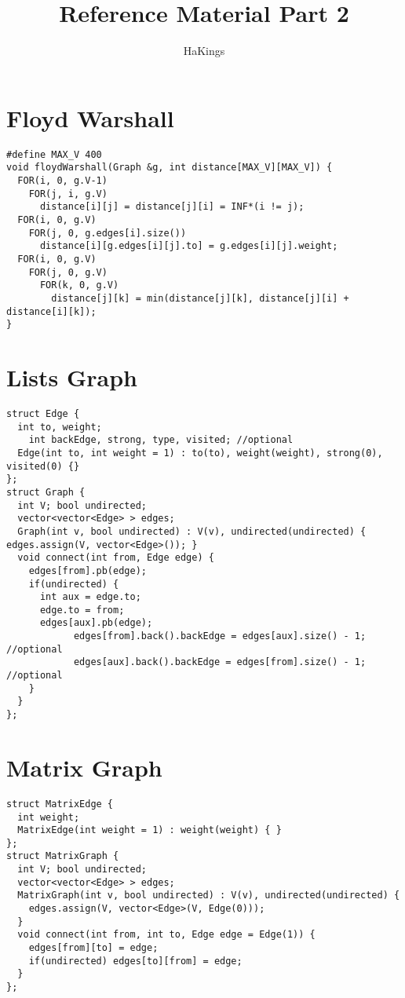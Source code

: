 \documentclass[11pt, oneside]{article}
\title{Reference Material Part 2}
\author{HaKings}
\date{}
\begin{document}
\maketitle
\newpage
\tableofcontents
\newpage

\section{Floyd Warshall}
\begin{lstlisting}
#define MAX_V 400
void floydWarshall(Graph &g, int distance[MAX_V][MAX_V]) {
  FOR(i, 0, g.V-1)
    FOR(j, i, g.V)
      distance[i][j] = distance[j][i] = INF*(i != j);
  FOR(i, 0, g.V)
    FOR(j, 0, g.edges[i].size())
      distance[i][g.edges[i][j].to] = g.edges[i][j].weight;
  FOR(i, 0, g.V)
    FOR(j, 0, g.V)
      FOR(k, 0, g.V)
        distance[j][k] = min(distance[j][k], distance[j][i] + distance[i][k]);
}
\end{lstlisting}
\section{Lists Graph}
\begin{lstlisting}
struct Edge {
  int to, weight;
    int backEdge, strong, type, visited; //optional
  Edge(int to, int weight = 1) : to(to), weight(weight), strong(0), visited(0) {}
};
struct Graph {
  int V; bool undirected;
  vector<vector<Edge> > edges;
  Graph(int v, bool undirected) : V(v), undirected(undirected) { edges.assign(V, vector<Edge>()); }
  void connect(int from, Edge edge) {
    edges[from].pb(edge);
    if(undirected) {
      int aux = edge.to;
      edge.to = from;
      edges[aux].pb(edge);
            edges[from].back().backEdge = edges[aux].size() - 1; //optional
            edges[aux].back().backEdge = edges[from].size() - 1; //optional
    }
  }
};

\end{lstlisting}
\section{Matrix Graph}
\begin{lstlisting}
struct MatrixEdge {
  int weight;
  MatrixEdge(int weight = 1) : weight(weight) { }
};
struct MatrixGraph {
  int V; bool undirected;
  vector<vector<Edge> > edges;
  MatrixGraph(int v, bool undirected) : V(v), undirected(undirected) {
    edges.assign(V, vector<Edge>(V, Edge(0)));
  }
  void connect(int from, int to, Edge edge = Edge(1)) {
    edges[from][to] = edge;
    if(undirected) edges[to][from] = edge;
  }
};

\end{lstlisting}
\end{document}
